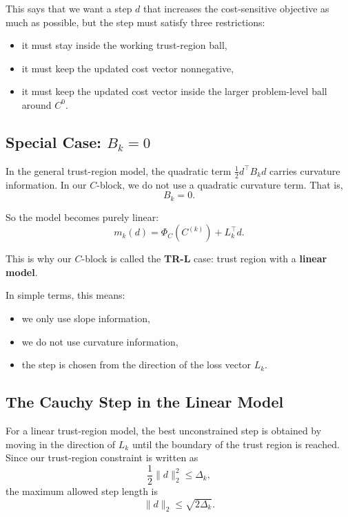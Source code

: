 \documentclass{article}
\begin{document}
This says that we want a step $d$ that increases the cost-sensitive objective as much as possible, but the step must satisfy three restrictions:
\begin{itemize}
    \item it must stay inside the working trust-region ball,
    \item it must keep the updated cost vector nonnegative,
    \item it must keep the updated cost vector inside the larger problem-level ball around $C^0$.
\end{itemize}

\subsection{Special Case: $B_k = 0$}

In the general trust-region model, the quadratic term $\frac{1}{2} d^\top B_k d$ carries curvature information. In our $C$-block, we do not use a quadratic curvature term. That is,
\begin{equation}
 B_k = 0.
\end{equation}

So the model becomes purely linear:
\begin{equation}
 m_k(d) = \Phi_C(C^{(k)}) + L_k^\top d.
\end{equation}

This is why our $C$-block is called the \textbf{TR-L} case: trust region with a \textbf{linear model}.

In simple terms, this means:
\begin{itemize}
    \item we only use slope information,
    \item we do not use curvature information,
    \item the step is chosen from the direction of the loss vector $L_k$.
\end{itemize}

\subsection{The Cauchy Step in the Linear Model}

For a linear trust-region model, the best unconstrained step is obtained by moving in the direction of $L_k$ until the boundary of the trust region is reached. Since our trust-region constraint is written as
\begin{equation}
 \frac{1}{2}\|d\|_2^2 \leq \Delta_k,
\end{equation}
the maximum allowed step length is
\begin{equation}
 \|d\|_2 \leq \sqrt{2\Delta_k}.
\end{equation}
\end{document}

